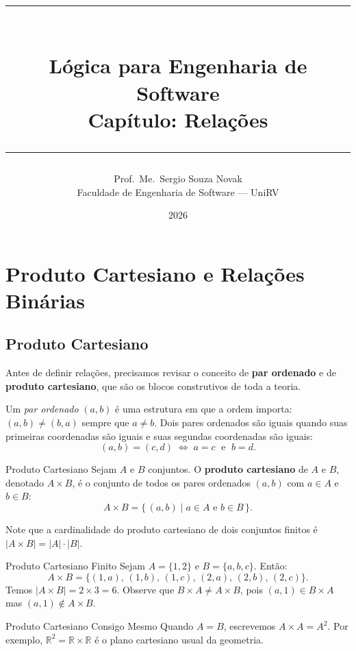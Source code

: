 \documentclass[12pt,a4paper]{book}
\title{%
  {\color{verdeprin}\rule{\linewidth}{2pt}}\\[0.4cm]
  {\Huge\bfseries Lógica para Engenharia de Software}\\[0.3cm]
  {\large\bfseries Capítulo: Relações}\\[0.2cm]
  {\color{verdeprin}\rule{\linewidth}{2pt}}
}
\author{Prof.\ Me.\ Sergio Souza Novak\\
  \small Faculdade de Engenharia de Software --- UniRV}
\date{2026}
\begin{document}

\maketitle
\tableofcontents
\newpage

\chapter{Produto Cartesiano e Relações Binárias}

\section{Produto Cartesiano}

Antes de definir relações, precisamos revisar o conceito de \textbf{par ordenado} e de \textbf{produto cartesiano}, que são os blocos construtivos de toda a teoria.

Um \emph{par ordenado} $(a, b)$ é uma estrutura em que a ordem importa: $(a, b) \neq (b, a)$ sempre que $a \neq b$. Dois pares ordenados são iguais quando suas primeiras coordenadas são iguais e suas segundas coordenadas são iguais:
\[
  (a, b) = (c, d) \;\Longleftrightarrow\; a = c \;\text{ e }\; b = d.
\]

\begin{definicao}{Produto Cartesiano}{}
Sejam $A$ e $B$ conjuntos. O \textbf{produto cartesiano} de $A$ e $B$, denotado $A \times B$, é o conjunto de todos os pares ordenados $(a, b)$ com $a \in A$ e $b \in B$:
\[
  A \times B = \{\,(a, b) \mid a \in A \text{ e } b \in B\,\}.
\]
\end{definicao}

Note que a cardinalidade do produto cartesiano de dois conjuntos finitos é $|A \times B| = |A| \cdot |B|$.

\begin{exemplo}{Produto Cartesiano Finito}{}
Sejam $A = \{1, 2\}$ e $B = \{a, b, c\}$. Então:
\[
  A \times B = \{(1,a),\,(1,b),\,(1,c),\,(2,a),\,(2,b),\,(2,c)\}.
\]
Temos $|A \times B| = 2 \times 3 = 6$. Observe que $B \times A \neq A \times B$, pois $(a, 1) \in B \times A$ mas $(a,1) \notin A \times B$.
\end{exemplo}

\begin{observacao}{Produto Cartesiano Consigo Mesmo}{}
Quando $A = B$, escrevemos $A \times A = A^2$. Por exemplo, $\mathbb{R}^2 = \mathbb{R} \times \mathbb{R}$ é o plano cartesiano usual da geometria.
\end{observacao}
\end{document}
